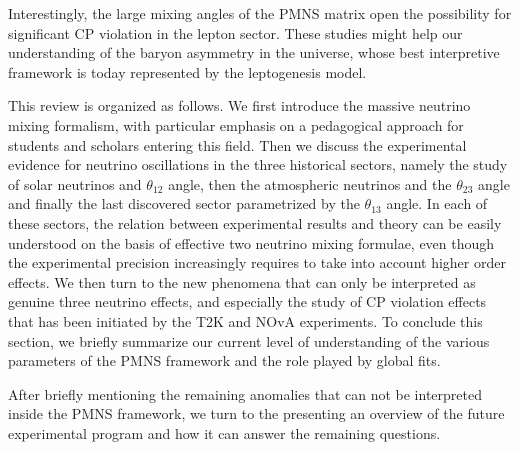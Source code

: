 Interestingly, the large mixing angles of the PMNS matrix open the possibility for significant CP violation in the lepton sector. These studies might help our understanding of the baryon asymmetry in the universe, whose best interpretive framework is today represented by the leptogenesis model.
 
This review is organized as follows. We first introduce the massive neutrino mixing formalism, with particular emphasis on a pedagogical approach for students and scholars entering this field. Then we discuss the experimental evidence for neutrino oscillations in the three historical sectors, namely the study of solar neutrinos and $\theta_{12}$ angle, then the atmospheric neutrinos and the $\theta_{23}$ angle and finally the last discovered sector parametrized by the $\theta_{13}$ angle. In each of these sectors, the relation between experimental results and theory can be easily understood on the basis of effective two neutrino mixing formulae, even though the experimental precision increasingly requires to take into account higher order effects. We then turn to the new phenomena that can only be interpreted as genuine three neutrino effects, and especially the study of CP violation effects that has been initiated by the T2K and NOvA experiments. To conclude this section, we briefly summarize our current level of understanding of the various parameters of the PMNS framework and the role played by global fits.

After briefly mentioning the remaining anomalies that can not be interpreted inside the PMNS framework, we turn to the presenting an overview of the future experimental program and how it can answer the remaining questions. 
